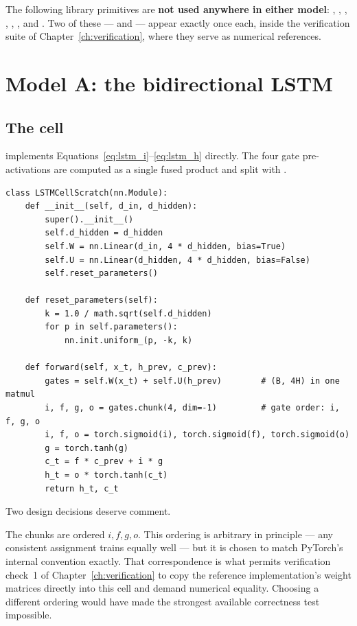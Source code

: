 The following library primitives are \textbf{not used anywhere in either model}: ,
, , , ,
,  and
. Two of these ---  and 
--- appear exactly once each, inside the verification suite of
Chapter~\ref{ch:verification}, where they serve as numerical references.

\section{Model A: the bidirectional LSTM}

\subsection{The cell}

 implements Equations~\ref{eq:lstm_i}--\ref{eq:lstm_h} directly. The four
gate pre-activations are computed as a single fused product and split with .

{\small
\begin{verbatim}
class LSTMCellScratch(nn.Module):
    def __init__(self, d_in, d_hidden):
        super().__init__()
        self.d_hidden = d_hidden
        self.W = nn.Linear(d_in, 4 * d_hidden, bias=True)
        self.U = nn.Linear(d_hidden, 4 * d_hidden, bias=False)
        self.reset_parameters()

    def reset_parameters(self):
        k = 1.0 / math.sqrt(self.d_hidden)
        for p in self.parameters():
            nn.init.uniform_(p, -k, k)

    def forward(self, x_t, h_prev, c_prev):
        gates = self.W(x_t) + self.U(h_prev)        # (B, 4H) in one matmul
        i, f, g, o = gates.chunk(4, dim=-1)         # gate order: i, f, g, o
        i, f, o = torch.sigmoid(i), torch.sigmoid(f), torch.sigmoid(o)
        g = torch.tanh(g)
        c_t = f * c_prev + i * g
        h_t = o * torch.tanh(c_t)
        return h_t, c_t
\end{verbatim}}

Two design decisions deserve comment.

 The chunks are ordered $i, f, g, o$. This ordering is arbitrary in
principle --- any consistent assignment trains equally well --- but it is chosen to match
PyTorch's internal convention exactly. That correspondence is what permits verification check~1 of
Chapter~\ref{ch:verification} to copy the reference implementation's weight matrices directly into
this cell and demand numerical equality. Choosing a different ordering would have made the
strongest available correctness test impossible.


